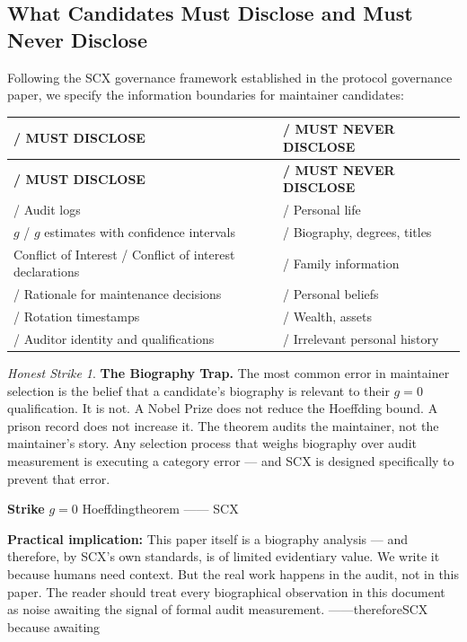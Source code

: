 \documentclass[12pt,a4paper]{article}
\theoremstyle{remark}
\newtheorem{honesthit}{Honest Strike}[section]
\newenvironment{hitbox}{%
  \begin{center}
  \color{critiquered}
  \begin{minipage}{0.92\textwidth}
  \begin{honesthit}
}{%
  \end{honesthit}
  \end{minipage}
  \end{center}
}
\begin{document}
\subsection{}
\subsection{What Candidates Must Disclose and Must Never Disclose}

Following the SCX governance framework established in the protocol governance
paper, we specify the information boundaries for maintainer candidates:

\begin{center}
\begin{longtable}{p{} p{}}
\toprule
\textbf{ / MUST DISCLOSE} & \textbf{ / MUST NEVER DISCLOSE} \\
\midrule
\endfirsthead
\toprule
\textbf{ / MUST DISCLOSE} & \textbf{ / MUST NEVER DISCLOSE} \\
\midrule
\endhead
\bottomrule
\endfoot
\midrule
 / Audit logs &  / Personal life \\
\midrule
$g$ / $g$ estimates with confidence intervals &  / Biography, degrees, titles \\
\midrule
Conflict of Interest / Conflict of interest declarations &  / Family information \\
\midrule
 / Rationale for maintenance decisions &  / Personal beliefs \\
\midrule
 / Rotation timestamps &  / Wealth, assets \\
\midrule
 / Auditor identity and qualifications &  / Irrelevant personal history \\
\bottomrule
\end{longtable}
\end{center}

\begin{hitbox}
\textbf{The Biography Trap.}
The most common error in maintainer selection is the belief that a candidate's
biography is relevant to their $g=0$ qualification. It is not. A Nobel Prize
does not reduce the Hoeffding bound. A prison record does not increase it.
The theorem audits the maintainer, not the maintainer's story. Any selection
process that weighs biography over audit measurement is executing a category
error — and SCX is designed specifically to prevent that error.

\textbf{Strike}
$g=0$
Hoeffdingtheorem
——
SCX

\textbf{Practical implication:} This paper itself is a biography analysis —
and therefore, by SCX's own standards, is of limited evidentiary value.
We write it because humans need context. But the real work happens in the
audit, not in this paper. The reader should treat every biographical
observation in this document as noise awaiting the signal of formal
audit measurement.
\textbf{}——thereforeSCX
because
awaiting
\end{hitbox}
\end{document}
